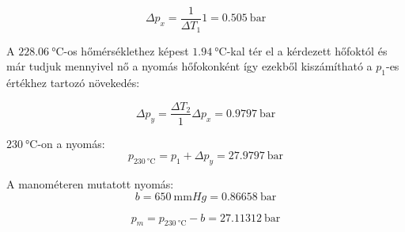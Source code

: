 \begin{equation}
	\Delta{p_x}=\frac{1}{\Delta{T_1}}1=\SI{0,505}{\bar}
\end{equation}

\noindent
A $\SI{228,06}{\celsius}$-os hőmérséklethez képest $\SI{1,94}{\celsius}$-kal tér el a kérdezett hőfoktól és már tudjuk mennyivel nő a nyomás hőfokonként így ezekből kiszámítható a $p_1$-es értékhez tartozó növekedés:

\begin{equation}
	\Delta{p_y}=\frac{\Delta{T_2}}{1}\Delta{p_x}
	= 
	\SI{0,9797}{\bar}
\end{equation}

\noindent
$\SI{230}{\celsius}$-on a nyomás:
\begin{equation}
	p_{\SI{230}{\celsius}}
	=
	p_1+\Delta{p_y}=\SI{27,9797}{\bar}
\end{equation}

\noindent
A manométeren mutatott nyomás:
\begin{equation*}
	b=\SI{650}{\milli\meter} Hg
 	= 
 	\SI{0,86658}{\bar}
\end{equation*}

\begin{equation}
	p_m=p_{\SI{230}{\celsius}}-b
	=
	\SI{27,11312}{\bar}
\end{equation}

\pagebreak

